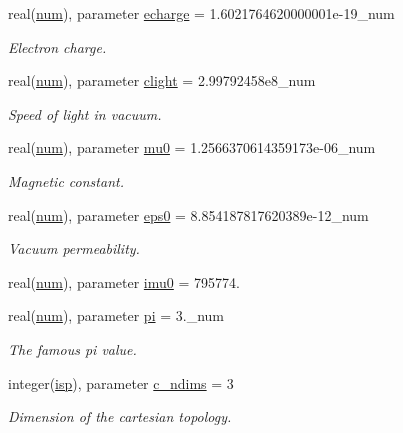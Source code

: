 \begin{DoxyCompactItemize}
real(\hyperlink{namespaceconstants_afe19f7f8af171411c51fb763b36e3823}{num}), parameter \hyperlink{namespaceconstants_af0f1098f6be55eab4174890ed5caaf98}{echarge} = 1.\+6021764620000001e-\/19\+\_\+num
\begin{DoxyCompactList}\small\item\em Electron charge. \end{DoxyCompactList}\item 
real(\hyperlink{namespaceconstants_afe19f7f8af171411c51fb763b36e3823}{num}), parameter \hyperlink{namespaceconstants_ac23d8857383002cada2aa571fd859533}{clight} = 2.\+99792458e8\+\_\+num
\begin{DoxyCompactList}\small\item\em Speed of light in vacuum. \end{DoxyCompactList}\item 
real(\hyperlink{namespaceconstants_afe19f7f8af171411c51fb763b36e3823}{num}), parameter \hyperlink{namespaceconstants_adf2453bfeefbefa1135a81f4ddfe4d6d}{mu0} = 1.\+2566370614359173e-\/06\+\_\+num
\begin{DoxyCompactList}\small\item\em Magnetic constant. \end{DoxyCompactList}\item 
real(\hyperlink{namespaceconstants_afe19f7f8af171411c51fb763b36e3823}{num}), parameter \hyperlink{namespaceconstants_a4fc609b4d7bd5d8e45e57bd0ba7c5e29}{eps0} = 8.\+854187817620389e-\/12\+\_\+num
\begin{DoxyCompactList}\small\item\em Vacuum permeability. \end{DoxyCompactList}\item 
real(\hyperlink{namespaceconstants_afe19f7f8af171411c51fb763b36e3823}{num}), parameter \hyperlink{namespaceconstants_abcf10ccefe6023e0401ce1b4a5f74fb5}{imu0} = 795774.
\item 
real(\hyperlink{namespaceconstants_afe19f7f8af171411c51fb763b36e3823}{num}), parameter \hyperlink{namespaceconstants_a736c2860cb0585043ad4abcd1c3352b1}{pi} = 3.\+\_\+num
\begin{DoxyCompactList}\small\item\em The famous pi value. \end{DoxyCompactList}\item 
integer(\hyperlink{namespaceconstants_a5a2ae450a00d2a29f9b70dcb776f7a2f}{isp}), parameter \hyperlink{namespaceconstants_aad8d45b739c41f2926fd2accb3de9dd2}{c\+\_\+ndims} = 3
\begin{DoxyCompactList}\small\item\em Dimension of the cartesian topology. \end{DoxyCompactList}\item 

\end{DoxyCompactItemize}
